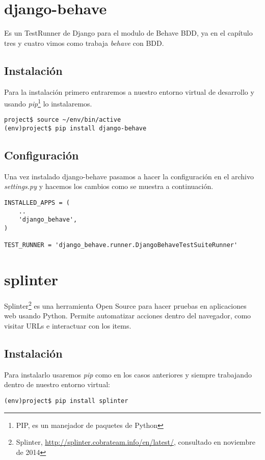 \section {django-behave}
Es un TestRunner de Django para el modulo de Behave BDD, ya en el capítulo tres
y cuatro vimos como trabaja {\it behave} con BDD.

\subsection{Instalación}
Para la instalación primero entraremos a nuestro entorno virtual de desarrollo y
usando {\it pip}\footnote{PIP, es un manejador de paquetes de Python} lo
instalaremos.
\begin{verbatim}
project$ source ~/env/bin/active
(env)project$ pip install django-behave
\end{verbatim}

\subsection{Configuración}
Una vez instalado django-behave pasamos a hacer la configuración en el archivo
{\it settings.py} y hacemos los cambios como se muestra a continuación.
\begin{verbatim}
INSTALLED_APPS = (
    ..
    'django_behave',
)

TEST_RUNNER = 'django_behave.runner.DjangoBehaveTestSuiteRunner'
\end{verbatim}

\section {splinter}
Splinter\footnote{Splinter, \url{http://splinter.cobrateam.info/en/latest/},
consultado en noviembre de 2014} es una herramienta Open Source para hacer
pruebas en aplicaciones web usando Python. Permite automatizar acciones dentro
del navegador, como visitar URLs e interactuar con los items.

\subsection{Instalación}
Para instalarlo usaremos {\it pip} como en los casos anteriores y siempre
trabajando dentro de nuestro entorno virtual:

\begin{verbatim}
(env)project$ pip install splinter
\end{verbatim}

